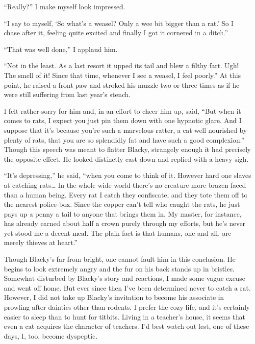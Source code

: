 \documentclass{book}
\begin{document}
``Really?'' I make myself look impressed.

``I say to myself, `So what's a weasel? Only a wee bit bigger than a
rat.' So I chase after it, feeling quite excited and finally I got it
cornered in a ditch.''

``That was well done,'' I applaud him.

``Not in the least. As a last resort it upped its tail and blew a filthy
fart. Ugh! The smell of it! Since that time, whenever I see a weasel, I
feel poorly.'' At this point, he raised a front paw and stroked his
muzzle two or three times as if he were still suffering from last year's
stench.

I felt rather sorry for him and, in an effort to cheer him up, said,
``But when it comes to rats, I expect you just pin them down with one
hypnotic glare. And I suppose that it's because you're such a marvelous
ratter, a cat well nourished by plenty of rats, that you are so
splendidly fat and have such a good complexion.'' Though this speech was
meant to flatter Blacky, strangely enough it had precisely the opposite
effect. He looked distinctly cast down and replied with a heavy sigh.

``It's depressing,'' he said, ``when you come to think of it. However
hard one slaves at catching rats\ldots{} In the whole wide world there's
no creature more brazen-faced than a human being. Every rat I catch they
confiscate, and they tote them off to the nearest police-box. Since the
copper can't tell who caught the rats, he just pays up a penny a tail to
anyone that brings them in. My master, for instance, has already earned
about half a crown purely through my efforts, but he's never yet stood
me a decent meal. The plain fact is that humans, one and all, are merely
thieves at heart.''

Though Blacky's far from bright, one cannot fault him in this
conclusion. He begins to look extremely angry and the fur on his back
stands up in bristles. Somewhat disturbed by Blacky's story and
reactions, I made some vague excuse and went off home. But ever since
then I've been determined never to catch a rat. However, I did not take
up Blacky's invitation to become his associate in prowling after
dainties other than rodents. I prefer the cozy life, and it's certainly
easier to sleep than to hunt for titbits. Living in a teacher's house,
it seems that even a cat acquires the character of teachers. I'd best
watch out lest, one of these days, I, too, become dyspeptic.
\end{document}
